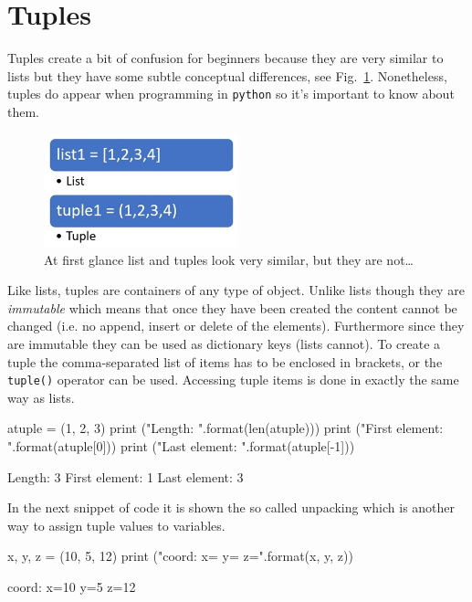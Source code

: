 \section{Tuples}\label{tuples}

Tuples create a bit of confusion for beginners because they are very similar to lists but they have some subtle conceptual differences, see Fig.~\ref{fig:tuples}. Nonetheless, tuples do appear when programming in \texttt{python} so it's important to know about them.

\begin{figure}[hb]
\centering
\includegraphics[width=0.5\textwidth]{figures/Difference-Between-List-and-Tuple-fig-1-2.jpg}
\caption{At first glance list and tuples look very similar, but they are not\ldots}
\label{fig:tuples}
\end{figure}

Like lists, tuples are containers of any type of object. Unlike lists though they are \emph{immutable} which means that once they have been created the content cannot be changed (i.e. no append, insert or delete of the elements). Furthermore since they are immutable they can be used as dictionary keys (lists cannot). To create a tuple the comma-separated list of items has to be enclosed in brackets, or the \texttt{tuple()} operator can be used. Accessing tuple items is done in exactly the same way as lists.

\begin{ipython}
atuple = (1, 2, 3)
print ("Length: {}".format(len(atuple)))
print ("First element: {}".format(atuple[0]))
print ("Last element: {}".format(atuple[-1]))
\end{ipython}
\begin{ioutput}
Length: 3
First element: 1
Last element: 3
\end{ioutput}

In the next snippet of code it is shown the so called unpacking which is another way to assign tuple values to variables.

\begin{ipython}
x, y, z = (10, 5, 12)
print ("coord: x={} y={} z={}".format(x, y, z))
\end{ipython}
\begin{ioutput}
coord: x=10 y=5 z=12
\end{ioutput}

